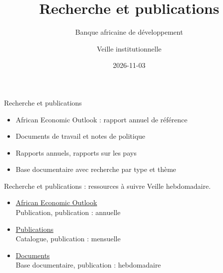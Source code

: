 \documentclass[aspectratio=169,11pt]{beamer}
\title{Recherche et publications}
\subtitle{Banque africaine de développement}
\author{Veille institutionnelle}
\date{2026-11-03}
\begin{document}
\begin{frame}\titlepage\end{frame}

\begin{frame}{Recherche et publications}
\begin{itemize}
\item African Economic Outlook : rapport annuel de référence
\item Documents de travail et notes de politique
\item Rapports annuels, rapports sur les pays
\item Base documentaire avec recherche par type et thème
\end{itemize}
\end{frame}

\begin{frame}{Recherche et publications : ressources à suivre}
\small
Veille hebdomadaire.
\begin{itemize}
\item \href{https://www.afdb.org/en/knowledge/publications/african-economic-outlook}{African Economic Outlook}\\{\footnotesize Publication, publication : annuelle}
\item \href{https://www.afdb.org/en/knowledge/publications}{Publications}\\{\footnotesize Catalogue, publication : mensuelle}
\item \href{https://www.afdb.org/en/documents}{Documents}\\{\footnotesize Base documentaire, publication : hebdomadaire}
\end{itemize}
\end{frame}
\end{document}
